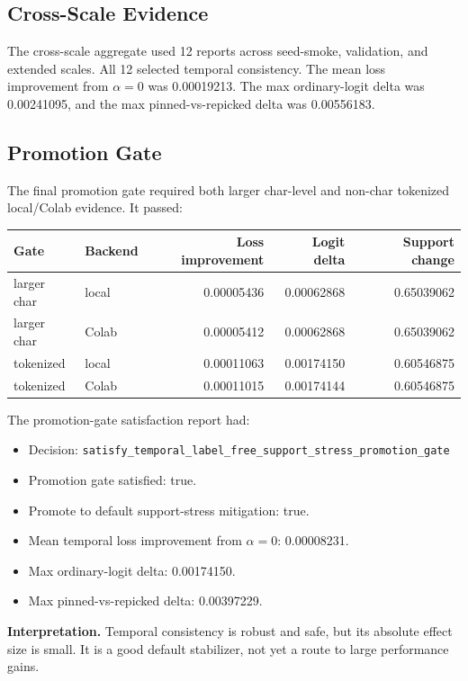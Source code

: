 \documentclass[11pt]{article}
\begin{document}
\subsection{Cross-Scale Evidence}

The cross-scale aggregate used 12 reports across seed-smoke, validation, and
extended scales. All 12 selected temporal consistency. The mean loss
improvement from $\alpha=0$ was 0.00019213. The max ordinary-logit delta was
0.00241095, and the max pinned-vs-repicked delta was 0.00556183.

\subsection{Promotion Gate}

The final promotion gate required both larger char-level and non-char tokenized
local/Colab evidence. It passed:

\begin{center}
\begin{tabular}{l l r r r}
\hline
Gate & Backend & Loss improvement & Logit delta & Support change \\
\hline
larger char & local & 0.00005436 & 0.00062868 & 0.65039062 \\
larger char & Colab & 0.00005412 & 0.00062868 & 0.65039062 \\
tokenized & local & 0.00011063 & 0.00174150 & 0.60546875 \\
tokenized & Colab & 0.00011015 & 0.00174144 & 0.60546875 \\
\hline
\end{tabular}
\end{center}

The promotion-gate satisfaction report had:

\begin{itemize}
  \item Decision: \texttt{satisfy\_temporal\_label\_free\_support\_stress\_promotion\_gate}
  \item Promotion gate satisfied: true.
  \item Promote to default support-stress mitigation: true.
  \item Mean temporal loss improvement from $\alpha=0$: 0.00008231.
  \item Max ordinary-logit delta: 0.00174150.
  \item Max pinned-vs-repicked delta: 0.00397229.
\end{itemize}

\textbf{Interpretation.} Temporal consistency is robust and safe, but its
absolute effect size is small. It is a good default stabilizer, not yet a route
to large performance gains.
\end{document}
